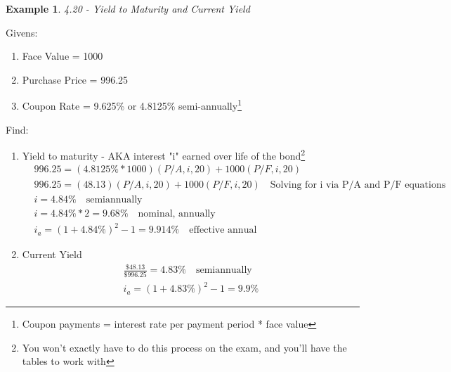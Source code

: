 \documentclass{report} %
\newtheorem{exmp}{Example}
\begin{document}
\begin{exmp}
    4.20 - Yield to Maturity and Current Yield
\end{exmp}
Givens:
\begin{enumerate}
    \item Face Value = 1000
    \item Purchase Price = 996.25
    \item Coupon Rate = 9.625\% or 4.8125\% semi-annually\footnote{Coupon payments  = interest rate per payment period * face value}
\end{enumerate}
Find: 
\begin{enumerate}
    \item Yield to maturity - AKA interest "i" earned over life of the bond\footnote{You won't exactly have to do this process on the exam, and you'll have the tables to work with}
    \begin{equation*}
        \begin{aligned}
            &996.25 =(4.8125\% *  1000) (P/A,i,20) + 1000(P/F,i,20)\\
            &996.25 =(48.13)(P/A,i,20) + 1000(P/F,i,20) \quad \text{Solving for i via P/A and P/F equations}\\ 
            &i = 4.84\% \quad \text{semiannually} \\ %
            &i = 4.84\% * 2 = 9.68\% \quad \text{nominal, annually} \\
            &i_a = (1+4.84\%)^2-1 = 9.914\% \quad \text{effective annual}
        \end{aligned}
    \end{equation*}
    \item Current Yield
    \begin{equation*}
        \begin{aligned}
            \frac{\$48.13}{\$996.25} = 4.83\% \quad \text{semiannually} \\
            i_a = (1+4.83\%)^2-1 = 9.9\% 
        \end{aligned}
    \end{equation*}
\end{enumerate}
\end{document}
